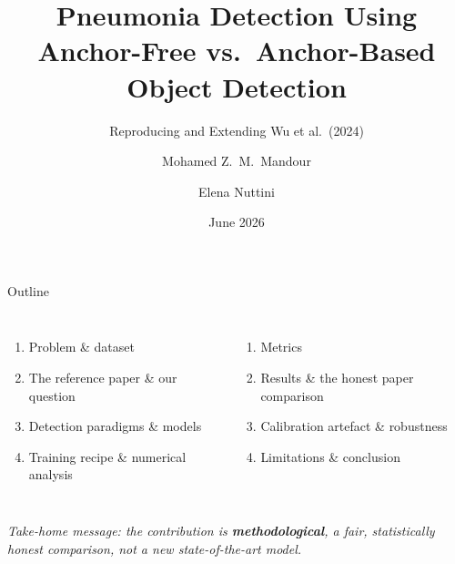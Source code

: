 \documentclass[aspectratio=169,11pt]{beamer}
\title[Anchor-Free vs.\ Anchor-Based Pneumonia Detection]{Pneumonia Detection Using\\ Anchor-Free vs.\ Anchor-Based Object Detection}
\subtitle{Reproducing and Extending Wu et al.\ (2024)}
\author[Mandour \& Nuttini]{Mohamed Z.\ M.\ Mandour \and Elena Nuttini}
\institute[PoliMI]{Numerical Analysis for Machine Learning\\Politecnico di Milano}
\date{June 2026}
\newcommand{\hl}[1]{\textcolor{polimi}{\textbf{#1}}}
\begin{document}
\begin{frame}[plain]
  \titlepage
\end{frame}

\begin{frame}{Outline}
  \small
  \begin{columns}[t]
      \begin{enumerate}\setlength\itemsep{0.4em}
        \item Problem \& dataset
        \item The reference paper \& our question
        \item Detection paradigms \& models
        \item Training recipe \& numerical analysis
      \end{enumerate}
      \begin{enumerate}\setlength\itemsep{0.4em}\setcounter{enumi}{4}
        \item Metrics
        \item Results \& the honest paper comparison
        \item Calibration artefact \& robustness
        \item Limitations \& conclusion
      \end{enumerate}
  \end{columns}
  \vfill
  \footnotesize\textit{Take-home message: the contribution is \hl{methodological}, a fair,
  statistically honest comparison, not a new state-of-the-art model.}
\end{frame}
\end{document}
